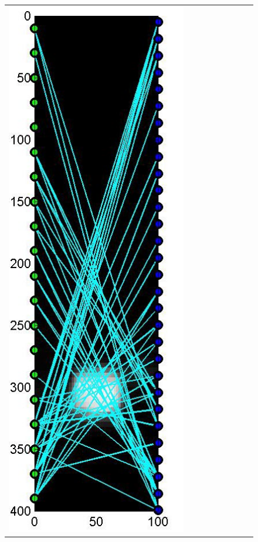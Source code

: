 \documentclass[11pt]{article}
\begin{document}
\begin{figure}[!h]
\begin{center}
\begin{tabular}{|c|c|c|c|c|c|c|c|c|}
			\includegraphics[width=.9\iwidth]{figures/newFigs/noisy/resultsExp-7-designs}
			&

\end{tabular}
\end{center}
\end{figure}
\end{document}
